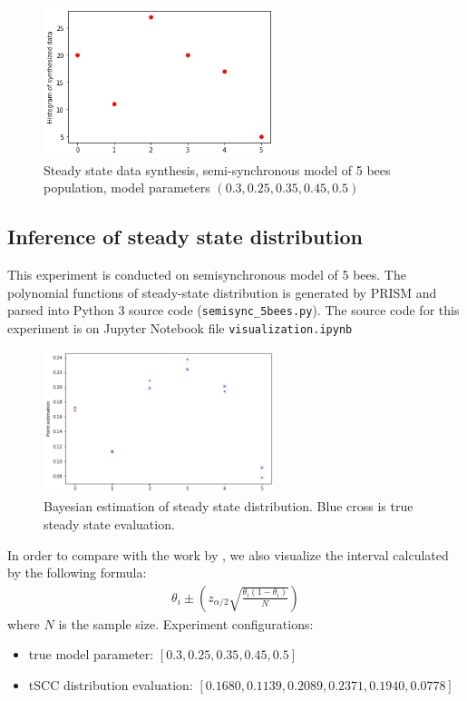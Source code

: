 \documentclass[12pt]{article}
\theoremstyle{definition}
\begin{document}
\begin{figure}[H]
  \centering
  \includegraphics[width=0.6\textwidth,keepaspectratio]{figures/data_synthesis.png}
  \caption{Steady state data synthesis, semi-synchronous model of 5 bees
    population, model parameters $(0.3, 0.25, 0.35, 0.45, 0.5)$}
\end{figure}

\subsection{Inference of steady state distribution}
This experiment is conducted on semisynchronous model of 5 bees. The polynomial
functions of steady-state distribution is generated by PRISM and parsed into
Python 3 source code
(\texttt{semisync\_5bees.py}). The source code for this
experiment is on Jupyter Notebook file \texttt{visualization.ipynb}
\begin{figure}[H]
  \centering
  \includegraphics[width=0.6\textwidth,keepaspectratio]{figures/point_estimation.png}
  \caption{Bayesian estimation of steady state distribution. Blue cross is true
    steady state evaluation.}
\end{figure}
In order to compare with the work by \cite{hajnal2019data}, we also visualize
the interval calculated by the following formula:
\begin{align*}
  \theta_i \pm (z_{\alpha / 2}\sqrt{\frac{\theta_i(1-\theta_i)}{N}})
\end{align*}
where $N$ is the sample size. Experiment configurations:
\begin{itemize}
\item true model parameter: $[0.3, 0.25, 0.35, 0.45, 0.5]$
\item tSCC distribution evaluation: $[0.1680, 0.1139, 0.2089, 0.2371, 0.1940, 0.0778]$ 
\end{itemize}
\end{document}
